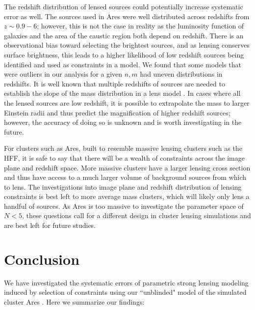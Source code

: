 The redshift distribution of lensed sources could potentially increase systematic error as well. The sources used in Ares were well distributed across redshifts from $z\sim0.9-6$; however, this is not the case in reality as the luminosity function of galaxies and the area of the caustic region both depend on redshift. There is an observational bias toward selecting the brightest sources, and as lensing conserves surface brightness, this leads to a higher likelihood of low redshift sources being identified and used as constraints in a model. We found that some models that were outliers in our analysis for a given $n,m$ had uneven distributions in redshifts. It is well known that multiple redshifts of sources are needed to establish the slope of the mass distribution in a lens model \citep[i.e., break the mass-sheet degeneracy, see][]{Schneider:1995vn}. In cases where all the lensed sources are low redshift, it is possible to extrapolate the mass to larger Einstein radii and thus predict the magnification of higher redshift sources; however, the accuracy of doing so is unknown and is worth investigating in the future.

\vspace{6pt}

For clusters such as Ares, built to resemble massive lensing clusters such as the HFF, it is safe to say that there will be a wealth of constraints across the image plane and redshift space. More massive clusters have a larger lensing cross section and thus have access to a much larger volume of background sources from which to lens. The investigations into image plane and redshift distribution of lensing constraints is best left to more average mass clusters, which will likely only lens a handful of sources. As Ares is too massive to investigate the parameter space of $N<5$, these questions call for a different design in cluster lensing simulations and are best left for future studies.

\section{Conclusion}

We have investigated the systematic errors of parametric strong lensing modeling induced by selection of constraints using our ``unblinded" model of the simulated cluster Ares \citep{Meneghetti:2016xe}. Here we summarize our findings:

